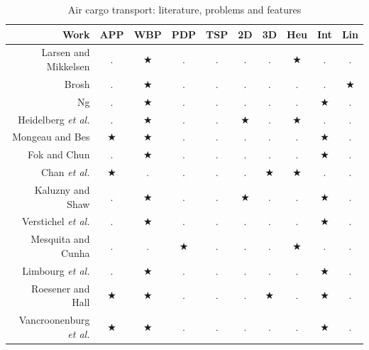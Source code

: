 \documentclass[preprint]{elsarticle}
\begin{document}
\begin{table}[H]
	\centering
	\caption{Air cargo transport: literature, problems and features}  \label{tab:sa}
	\scriptsize
	\renewcommand{\arraystretch}{1.1} 
	\begin{tabular}{r|cccc|ccccc}
		\toprule
		 Work & {\bf APP}  & {\bf WBP}  &  {\bf PDP}   &{\bf TSP}   & {\bf 2D}  & {\bf 3D}  & {\bf Heu}  & {\bf Int}  & {\bf Lin} \\
		\midrule
		Larsen and Mikkelsen \cite{LarsenMikkelsen1979}  & $.$        & $\bigstar$ & $.$          & $.$        & $.$       & $.$       & $\bigstar$ & $.$        &  $.$ \\
		Brosh \cite{Brosh1981}  & $.$ & $\bigstar$  & $.$   & $.$ & $.$ & $.$   & $.$  & $.$  &  $\bigstar$ \\
		Ng \cite{Kevin1992}  & $.$ & $\bigstar$  & $.$ & $.$ & $.$ &$.$   & $.$  & $\bigstar$  &  $.$ \\
		Heidelberg {\it et al.} \cite{Heidelberg1998}  & $.$ & $\bigstar$  & $.$ & $.$ & $\bigstar$ &$.$   & $\bigstar$  & $.$  &  $.$ \\
		Mongeau and Bes \cite{MongeauBes2003}    & $\bigstar$ & $\bigstar$   & $.$ & $.$ & $.$ & $.$   & $.$  & $\bigstar$  &  $.$ \\
		Fok and Chun \cite{fok2004optimizing} & $.$ & $\bigstar$   & $.$ & $.$ & $.$ & $.$   & $.$  & $\bigstar$  &  $.$ \\	
		Chan {\it et al.} \cite{Chan2006}  & $\bigstar$ & $.$    & $.$ & $.$ & $.$ & $\bigstar$  & $\bigstar$  & $.$  &  $.$ \\
		Kaluzny and Shaw \cite{KaluznyBohdanL2009Oalb}  & $.$ & $\bigstar$  & $.$  & $.$ & $\bigstar$ &$.$  & $.$  & $\bigstar$  &  $.$ \\
		Verstichel {\it et al.} \cite{Verstichel2011}   & $.$ & $\bigstar$    & $.$ & $.$ & $.$ & $.$   & $.$  & $\bigstar$  &  $.$ \\
		Mesquita and Cunha \cite{MesquitaCunha2011}   & $.$ & $.$    & $\bigstar$ & $.$ & $.$ & $.$   & $\bigstar$  & $.$  &  $.$ \\		
		Limbourg {\it et al.} \cite{Limbourg2012} & $.$ & $\bigstar$  & $.$ & $.$ & $.$ & $.$   & $.$  & $\bigstar$  &  $.$ \\
		Roesener and Hall \cite{RoesenerHall2014}  & $\bigstar$ & $\bigstar$  & $.$  & $.$ & $.$ & $\bigstar$   & $.$  & $\bigstar$  &  $.$ \\
		Vancroonenburg {\it et al.} \cite{Vancroonenburg2014}  & $\bigstar$ & $\bigstar$   & $.$ & $.$ & $.$ & $.$   & $.$  & $\bigstar$  &  $.$ \\

\end{tabular}
\end{table}
\end{document}
